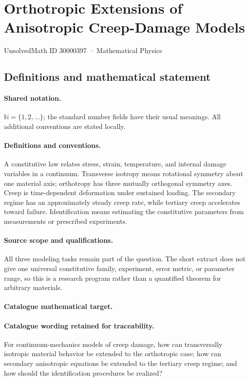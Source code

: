 \documentclass[11pt]{article}
\begin{document}
\setcounter{section}{30000396}
\section{Orthotropic Extensions of Anisotropic Creep-Damage Models}\label{30000397}
{\small UnsolvedMath ID 30000397 · Mathematical Physics}
\subsection{Definitions and mathematical statement}

\paragraph{Shared notation.}$\mathbb N=\{1,2,\ldots\}$; the standard number fields have their usual meanings. All additional conventions are stated locally.


\paragraph{Definitions and conventions.} A constitutive law relates stress, strain, temperature, and internal damage variables in a continuum. Transverse isotropy means rotational symmetry about one material axis; orthotropy has three mutually orthogonal symmetry axes. Creep is time-dependent deformation under sustained loading. The secondary regime has an approximately steady creep rate, while tertiary creep accelerates toward failure. Identification means estimating the constitutive parameters from measurements or prescribed experiments.

\paragraph{Source scope and qualifications.} All three modeling tasks remain part of the question. The short extract does not give one universal constitutive family, experiment, error metric, or parameter range, so this is a research program rather than a quantified theorem for arbitrary materials.

\paragraph{Catalogue mathematical target.}
\paragraph{Catalogue wording retained for traceability.}
For continuum-mechanics models of creep damage, how can transversally isotropic material behavior be extended to the orthotropic case; how can secondary anisotropic equations be extended to the tertiary creep regime; and how should the identification procedures be realized?
\end{document}
